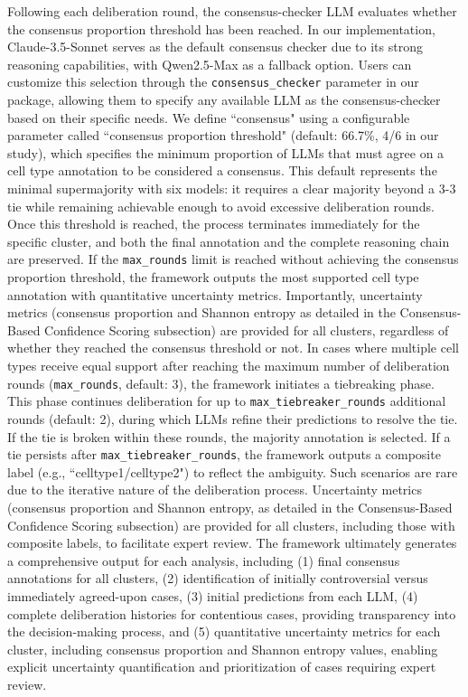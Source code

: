 \documentclass[pdflatex,sn-nature]{sn-jnl}%
\theoremstyle{thmstyleone}%
\theoremstyle{thmstyletwo}%
\theoremstyle{thmstylethree}%
\begin{document}
Following each deliberation round, the consensus-checker LLM evaluates whether the consensus proportion threshold has been reached. In our implementation, Claude-3.5-Sonnet serves as the default consensus checker due to its strong reasoning capabilities, with Qwen2.5-Max as a fallback option. Users can customize this selection through the \texttt{consensus\_checker} parameter in our package, allowing them to specify any available LLM as the consensus-checker based on their specific needs. We define ``consensus" using a configurable parameter called ``consensus proportion threshold" (default: 66.7\%, 4/6 in our study), which specifies the minimum proportion of LLMs that must agree on a cell type annotation to be considered a consensus. This default represents the minimal supermajority with six models: it requires a clear majority beyond a 3-3 tie while remaining achievable enough to avoid excessive deliberation rounds.
Once this threshold is reached, the process terminates immediately for the specific cluster, and both the final annotation and the complete reasoning chain are preserved. If the \texttt{max\_rounds} limit is reached without achieving the consensus proportion threshold, the framework outputs the most supported cell type annotation with quantitative uncertainty metrics. Importantly, uncertainty metrics (consensus proportion and Shannon entropy as detailed in the Consensus-Based Confidence Scoring subsection) are provided for all clusters, regardless of whether they reached the consensus threshold or not. In cases where multiple cell types receive equal support after reaching the maximum number of deliberation rounds (\texttt{max\_rounds}, default: 3), the framework initiates a tiebreaking phase. This phase continues deliberation for up to \texttt{max\_tiebreaker\_rounds} additional rounds (default: 2), during which LLMs refine their predictions to resolve the tie. If the tie is broken within these rounds, the majority annotation is selected. If a tie persists after \texttt{max\_tiebreaker\_rounds}, the framework outputs a composite label (e.g., ``celltype1/celltype2") to reflect the ambiguity. Such scenarios are rare due to the iterative nature of the deliberation process. Uncertainty metrics (consensus proportion and Shannon entropy, as detailed in the Consensus-Based Confidence Scoring subsection) are provided for all clusters, including those with composite labels, to facilitate expert review.
The framework ultimately generates a comprehensive output for each analysis, including (1) final consensus annotations for all clusters, (2) identification of initially controversial versus immediately agreed-upon cases, (3) initial predictions from each LLM, (4) complete deliberation histories for contentious cases, providing transparency into the decision-making process, and (5) quantitative uncertainty metrics for each cluster, including consensus proportion and Shannon entropy values, enabling explicit uncertainty quantification and prioritization of cases requiring expert review.
\end{document}
